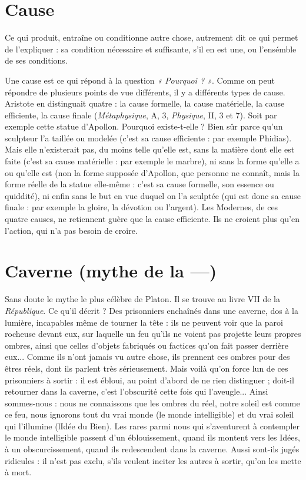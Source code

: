 \section{Cause}
Ce qui produit, entraîne ou conditionne autre chose, autrement dit
ce qui permet de l'expliquer : sa condition nécessaire et suffisante,
s’il en est une, ou l’ensémble de ses conditions.

Une cause est ce qui répond à la question {\it « Pourquoi ? »}. Comme on peut
répondre de plusieurs points de vue différents, il y a différents types de cause.
Aristote en distinguait quatre : la cause formelle, la cause matérielle, la cause
efficiente, la cause finale ({\it Métaphysique}, A, 3, {\it Physique}, II, 3 et 7). Soit par
exemple cette statue d’Apollon. Pourquoi existe-t-elle ? Bien sûr parce qu’un
sculpteur l’a taillée ou modelée (c’est sa cause efficiente : par exemple Phidias).
Mais elle n’existerait pas, du moins telle qu’elle est, sans la matière dont elle est
faite (c’est sa cause matérielle : par exemple le marbre), ni sans la forme qu’elle
a ou qu’elle est (non la forme supposée d’Apollon, que personne ne connaît,
mais la forme réelle de la statue elle-même : c’est sa cause formelle, son essence
ou quiddité), ni enfin sans le but en vue duquel on l’a sculptée (qui est donc sa
cause finale : par exemple la gloire, la dévotion ou l’argent). Les Modernes, de
ces quatre causes, ne retiennent guère que la cause efficiente. Ils ne croient plus
qu’en l’action, qui n’a pas besoin de croire.

\section{Caverne (mythe de la —)}
Sans doute le mythe le plus célèbre de
Platon. Il se trouve au livre VII de la {\it République}.
Ce qu’il décrit ? Des prisonniers enchaînés dans une caverne, dos à la
lumière, incapables même de tourner la tête : ils ne peuvent voir que la paroi
rocheuse devant eux, sur laquelle un feu qu’ils ne voient pas projette leurs
propres ombres, ainsi que celles d’objets fabriqués ou factices qu’on fait passer
derrière eux... Comme ils n’ont jamais vu autre chose, ils prennent ces ombres
pour des êtres réels, dont ils parlent très sérieusement. Mais voilà qu’on force
lun de ces prisonniers à sortir : il est ébloui, au point d’abord de ne rien
distinguer ; doit-il retourner dans la caverne, c’est l’obscurité cette fois qui
l’aveugle... Ainsi sommes-nous : nous ne connaissons que les ombres du réel,
notre soleil est comme ce feu, nous ignorons tout du vrai monde (le monde
intelligible) et du vrai soleil qui l’illumine (lIdée du Bien). Les rares parmi
nous qui s’aventurent à contempler le monde intelligible passent d’un éblouissement,
quand ils montent vers les Idées, à un obscurcissement, quand ils
redescendent dans la caverne. Aussi sont-ils jugés ridicules : il n’est pas exclu,
s'ils veulent inciter les autres à sortir, qu’on les mette à mort.

